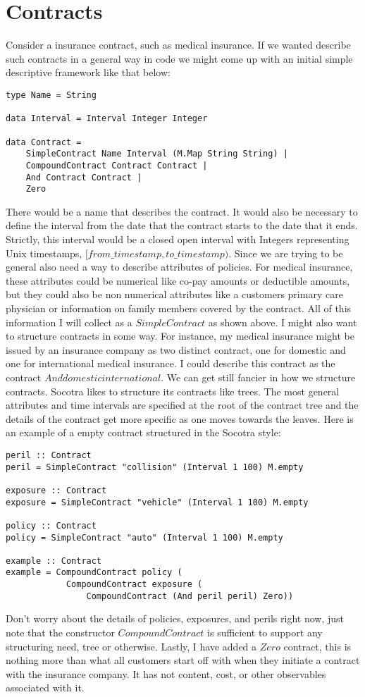 \section{Contracts}
\label{sec:01:1}
Consider a insurance contract, such as medical insurance. If we wanted describe such contracts in a general way
in code we might come up with an initial simple descriptive framework like that below:
\begin{lstlisting}
type Name = String

data Interval = Interval Integer Integer

data Contract = 
    SimpleContract Name Interval (M.Map String String) |
    CompoundContract Contract Contract |
    And Contract Contract |
    Zero
\end{lstlisting}
There would be a name that describes the contract. It would also be necessary to define the interval from the
date that the contract starts to the date that it ends. Strictly, this interval would be a closed open interval
with Integers representing Unix timestamps, $[from\_timestamp, to\_timestamp)$. Since we are trying to be
general also need a way to describe attributes of policies. For medical insurance, these attributes could
be numerical like co-pay amounts or deductible amounts, but they could also be non numerical attributes like
a customers primary care physician or information on family members covered by the contract. All of this information
I will collect as a $SimpleContract$ as shown above. I might also want to structure contracts in some way. For
instance, my medical insurance might be issued by an insurance company as two distinct contract, one for
domestic and one for international medical insurance. I could describe this contract as the contract
$ And domestic international $. We can get still fancier in how we structure contracts. Socotra likes to structure
its contracts like trees. The most general attributes and time intervals are specified at the root of the
contract tree and the details of the contract get more specific as one moves towards the leaves. Here is
an example of a empty contract structured in the Socotra style:
\begin{lstlisting}
peril :: Contract
peril = SimpleContract "collision" (Interval 1 100) M.empty

exposure :: Contract
exposure = SimpleContract "vehicle" (Interval 1 100) M.empty

policy :: Contract
policy = SimpleContract "auto" (Interval 1 100) M.empty

example :: Contract
example = CompoundContract policy (
            CompoundContract exposure (
                CompoundContract (And peril peril) Zero))
\end{lstlisting}
Don't worry about the details of policies, exposures, and perils right now, just note that the constructor $CompoundContract$
is sufficient to support any structuring need, tree or otherwise. Lastly, I have added a $Zero$ contract, this is nothing more
than what all customers start off with when they initiate a contract with the insurance company. It has not content, cost, or other observables
associated with it.


